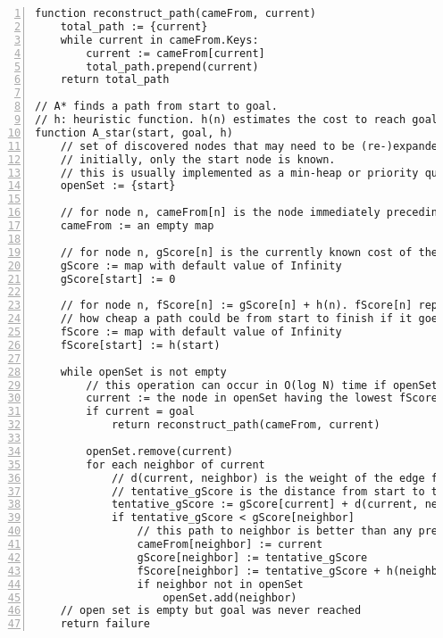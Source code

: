 \documentclass{article}
\begin{document}
\begin{Verbatim}[numbers=left,xleftmargin=5mm]
function reconstruct_path(cameFrom, current)
    total_path := {current}
    while current in cameFrom.Keys:
        current := cameFrom[current]
        total_path.prepend(current)
    return total_path

// A* finds a path from start to goal.
// h: heuristic function. h(n) estimates the cost to reach goal from node n.
function A_star(start, goal, h)
    // set of discovered nodes that may need to be (re-)expanded.
    // initially, only the start node is known.
    // this is usually implemented as a min-heap or priority queue rather than a hash-set.
    openSet := {start}
    
    // for node n, cameFrom[n] is the node immediately preceding it on the cheapest path from the start
    cameFrom := an empty map
    
    // for node n, gScore[n] is the currently known cost of the cheapest path from start to n.
    gScore := map with default value of Infinity
    gScore[start] := 0
    
    // for node n, fScore[n] := gScore[n] + h(n). fScore[n] represents our current best guess as to\\
    // how cheap a path could be from start to finish if it goes through n.
    fScore := map with default value of Infinity
    fScore[start] := h(start)
    
    while openSet is not empty
        // this operation can occur in O(log N) time if openSet is a min-heap or a priority queue
        current := the node in openSet having the lowest fScore[] value
        if current = goal
            return reconstruct_path(cameFrom, current)
        
        openSet.remove(current)
        for each neighbor of current
            // d(current, neighbor) is the weight of the edge from current to neighbor
            // tentative_gScore is the distance from start to the neighbor through current
            tentative_gScore := gScore[current] + d(current, neighbor)
            if tentative_gScore < gScore[neighbor]
                // this path to neighbor is better than any previous one. Record it!
                cameFrom[neighbor] := current
                gScore[neighbor] := tentative_gScore
                fScore[neighbor] := tentative_gScore + h(neighbor)
                if neighbor not in openSet
                    openSet.add(neighbor)
    // open set is empty but goal was never reached
    return failure
\end{Verbatim}
\end{document}
